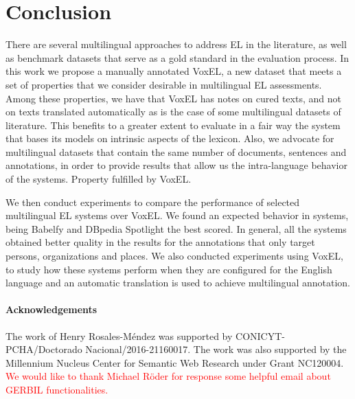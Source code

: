 \documentclass{llncs}
\begin{document}
\section{Conclusion}
\label{sec:conclusion}

There are several multilingual approaches to address EL in the literature, as well as benchmark datasets that serve as a gold standard in the evaluation process. In this work we propose a manually annotated VoxEL, a new dataset that meets a set of properties that we consider desirable in multilingual EL assessments. Among these properties, we have that VoxEL has notes on cured texts, and not on texts translated automatically as is the case of some multilingual datasets of literature. This benefits to a greater extent to evaluate in a fair way the system that bases its models on intrinsic aspects of the lexicon. Also, we advocate for multilingual datasets that contain the same number of documents, sentences and annotations, in order to provide results that allow us the intra-language behavior of the systems. Property fulfilled by VoxEL.

We then conduct experiments to compare the performance of selected multilingual EL systems over VoxEL. We found an expected behavior in systems, being Babelfy and DBpedia Spotlight the best scored. In general, all the systems obtained better quality in the results for the annotations that only target persons, organizations and places. We also conducted experiments using VoxEL, to study how these systems perform when they are configured for the English language and an automatic translation is used to achieve multilingual annotation. 


{\footnotesize
\paragraph{Acknowledgements} The work of Henry Rosales-M\'endez was supported by CONICYT-PCHA/Doctorado Nacional/2016-21160017. The work was also supported by the Millennium Nucleus Center for Semantic Web Research under Grant NC120004. \textcolor{red}{We would like to thank Michael R\"oder for response some helpful email about GERBIL functionalities.}}

%
%
%



\end{document}
